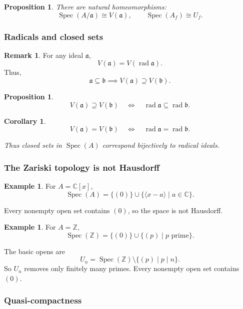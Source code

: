 \documentclass[11pt,a4paper]{article}
\theoremstyle{definition}
\newtheorem{example}[definition]{Example}
\newtheorem{remark}[definition]{Remark}
\theoremstyle{plain}
\newtheorem{proposition}[definition]{Proposition}
\newtheorem{corollary}[definition]{Corollary}
\theoremstyle{remark}
\newcommand{\Z}{\mathbb{Z}}
\newcommand{\C}{\mathbb{C}}
\newcommand{\Spec}{\operatorname{Spec}}
\newcommand{\rad}{\operatorname{rad}}
\begin{document}
\begin{proposition}
There are natural homeomorphisms:
\[
\Spec(A/\mathfrak a)\cong V(\mathfrak a),
\qquad
\Spec(A_f)\cong U_{f}.
\]
\end{proposition}

\subsubsection*{Radicals and closed sets}

\begin{remark}
For any ideal $\mathfrak a$,
\[
V(\mathfrak a)=V(\rad \mathfrak{a}).
\]
Thus,
\[
\mathfrak a\subseteq\mathfrak b\implies V(\mathfrak a)\supseteq V(\mathfrak b).
\]
\end{remark}

\begin{proposition}
\[
V(\mathfrak a)\supseteq V(\mathfrak b)
\quad\Longleftrightarrow\quad
\rad \mathfrak{a}\subseteq\rad \mathfrak{b}.
\]
\end{proposition}

\begin{corollary}
\[
V(\mathfrak a)=V(\mathfrak b)
\quad\Longleftrightarrow\quad
\rad \mathfrak{a}=\rad \mathfrak{b}.
\]

Thus closed sets in $\Spec(A)$ correspond bijectively to radical ideals.
\end{corollary}

\subsubsection*{The Zariski topology is not Hausdorff}

\begin{example}
For $A=\C[x]$,
\[
\Spec(A)=\{(0)\}\cup\{\langle x-a\rangle\mid a\in\C\}.
\]

Every nonempty open set contains $(0)$, so the space is not Hausdorff.
\end{example}

\begin{example}
For $A=\Z$,
\[
\Spec(\Z)=\{(0)\}\cup\{(p)\mid p\text{ prime}\}.
\]

The basic opens are
\[
U_n=\Spec(\Z)\setminus\{(p)\mid p\mid n\}.
\]
So $U_n$ removes only finitely many primes.
Every nonempty open set contains $(0)$.
\end{example}

\subsubsection*{Quasi-compactness}
\end{document}
